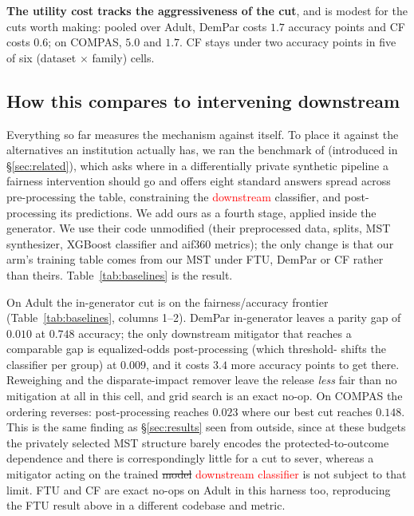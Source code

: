 \documentclass{article}
\begin{document}
\textbf{The utility cost tracks the aggressiveness of the cut}, and is modest
for the cuts worth making: pooled over Adult, DemPar costs $1.7$ accuracy
points and CF costs $0.6$; on COMPAS, $5.0$ and $1.7$. CF stays under two
accuracy points in five of six (dataset $\times$ family) cells.

\subsection{How this compares to intervening downstream}



Everything so far measures the mechanism against itself. To place it against
the alternatives an institution actually has, we ran the benchmark of
\citet{angelozzi2026where} (introduced in \S\ref{sec:related}), which asks
where in a differentially private synthetic pipeline a fairness intervention
should go and offers eight standard answers spread across pre-processing the
table, constraining the \textcolor{red}{downstream} classifier, and post-processing its predictions. We
add ours as a fourth stage, applied inside the generator. We use their code
unmodified (their preprocessed data, splits, MST synthesizer, XGBoost
classifier and aif360 metrics); the only change is that our arm's training
table comes from our MST under FTU, DemPar or CF rather than theirs.
Table~\ref{tab:baselines} is the result.

On Adult the in-generator cut is on the fairness/accuracy frontier
(Table~\ref{tab:baselines}, columns 1--2). DemPar in-generator leaves a
parity gap of $0.010$ at $0.748$ accuracy; the only downstream mitigator that
reaches a comparable gap is equalized-odds post-processing (which threshold-
shifts the classifier per group) at $0.009$, and it costs $3.4$ more accuracy
points to get there. Reweighing and the disparate-impact remover leave the
release \emph{less} fair than no mitigation at all in this cell, and grid
search is an exact no-op. On COMPAS the ordering reverses: post-processing
reaches $0.023$ where our best cut reaches $0.148$. This is the same finding
as \S\ref{sec:results} seen from outside, since at these budgets the
privately selected MST structure barely encodes the protected-to-outcome
dependence and there is correspondingly little for a cut to sever, whereas a
mitigator acting on the trained \st{model} \textcolor{red}{downstream classifier} is not subject to that limit. FTU and
CF are exact no-ops on Adult in this harness too, reproducing the FTU result
above in a different codebase and metric.
\end{document}
